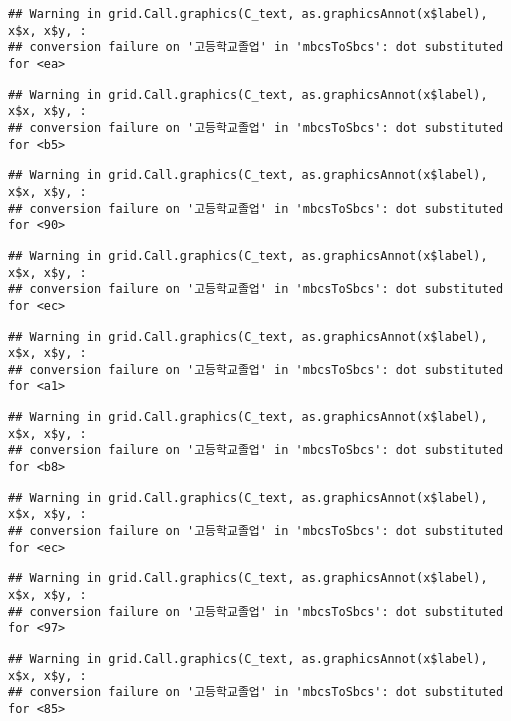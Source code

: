 \documentclass[
]{article}
\begin{document}
\begin{verbatim}
## Warning in grid.Call.graphics(C_text, as.graphicsAnnot(x$label), x$x, x$y, :
## conversion failure on '고등학교졸업' in 'mbcsToSbcs': dot substituted for <ea>
\end{verbatim}

\begin{verbatim}
## Warning in grid.Call.graphics(C_text, as.graphicsAnnot(x$label), x$x, x$y, :
## conversion failure on '고등학교졸업' in 'mbcsToSbcs': dot substituted for <b5>
\end{verbatim}

\begin{verbatim}
## Warning in grid.Call.graphics(C_text, as.graphicsAnnot(x$label), x$x, x$y, :
## conversion failure on '고등학교졸업' in 'mbcsToSbcs': dot substituted for <90>
\end{verbatim}

\begin{verbatim}
## Warning in grid.Call.graphics(C_text, as.graphicsAnnot(x$label), x$x, x$y, :
## conversion failure on '고등학교졸업' in 'mbcsToSbcs': dot substituted for <ec>
\end{verbatim}

\begin{verbatim}
## Warning in grid.Call.graphics(C_text, as.graphicsAnnot(x$label), x$x, x$y, :
## conversion failure on '고등학교졸업' in 'mbcsToSbcs': dot substituted for <a1>
\end{verbatim}

\begin{verbatim}
## Warning in grid.Call.graphics(C_text, as.graphicsAnnot(x$label), x$x, x$y, :
## conversion failure on '고등학교졸업' in 'mbcsToSbcs': dot substituted for <b8>
\end{verbatim}

\begin{verbatim}
## Warning in grid.Call.graphics(C_text, as.graphicsAnnot(x$label), x$x, x$y, :
## conversion failure on '고등학교졸업' in 'mbcsToSbcs': dot substituted for <ec>
\end{verbatim}

\begin{verbatim}
## Warning in grid.Call.graphics(C_text, as.graphicsAnnot(x$label), x$x, x$y, :
## conversion failure on '고등학교졸업' in 'mbcsToSbcs': dot substituted for <97>
\end{verbatim}

\begin{verbatim}
## Warning in grid.Call.graphics(C_text, as.graphicsAnnot(x$label), x$x, x$y, :
## conversion failure on '고등학교졸업' in 'mbcsToSbcs': dot substituted for <85>
\end{verbatim}
\end{document}
